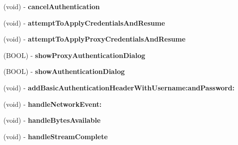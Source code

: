 \begin{DoxyCompactItemize}
\item 
\hypertarget{interface_a_s_i_h_t_t_p_request_a25d3d77f917c5f8b9956f6a45022dae2}{
(void) -\/ {\bfseries cancel\-Authentication}}
\label{interface_a_s_i_h_t_t_p_request_a25d3d77f917c5f8b9956f6a45022dae2}

\item 
\hypertarget{interface_a_s_i_h_t_t_p_request_ad3da0a488faf41101bbf73a8071456e8}{
(void) -\/ {\bfseries attempt\-To\-Apply\-Credentials\-And\-Resume}}
\label{interface_a_s_i_h_t_t_p_request_ad3da0a488faf41101bbf73a8071456e8}

\item 
\hypertarget{interface_a_s_i_h_t_t_p_request_a03ce363e92c2d5dbe7229f021b0230a5}{
(void) -\/ {\bfseries attempt\-To\-Apply\-Proxy\-Credentials\-And\-Resume}}
\label{interface_a_s_i_h_t_t_p_request_a03ce363e92c2d5dbe7229f021b0230a5}

\item 
\hypertarget{interface_a_s_i_h_t_t_p_request_ad9c4b7b0abc790e74806860c6d7a7a5b}{
(\-B\-O\-O\-L) -\/ {\bfseries show\-Proxy\-Authentication\-Dialog}}
\label{interface_a_s_i_h_t_t_p_request_ad9c4b7b0abc790e74806860c6d7a7a5b}

\item 
\hypertarget{interface_a_s_i_h_t_t_p_request_a64d812546f152b29ddd614938ffa5539}{
(\-B\-O\-O\-L) -\/ {\bfseries show\-Authentication\-Dialog}}
\label{interface_a_s_i_h_t_t_p_request_a64d812546f152b29ddd614938ffa5539}

\item 
\hypertarget{interface_a_s_i_h_t_t_p_request_a0295b7fbbc9af2be76f9dfe06f75f1ca}{
(void) -\/ {\bfseries add\-Basic\-Authentication\-Header\-With\-Username\-:and\-Password\-:}}
\label{interface_a_s_i_h_t_t_p_request_a0295b7fbbc9af2be76f9dfe06f75f1ca}

\item 
\hypertarget{interface_a_s_i_h_t_t_p_request_a271ec6e669cafa5063866022fb3577ba}{
(void) -\/ {\bfseries handle\-Network\-Event\-:}}
\label{interface_a_s_i_h_t_t_p_request_a271ec6e669cafa5063866022fb3577ba}

\item 
\hypertarget{interface_a_s_i_h_t_t_p_request_aefae44a699dc9e70b78930322cfb3558}{
(void) -\/ {\bfseries handle\-Bytes\-Available}}
\label{interface_a_s_i_h_t_t_p_request_aefae44a699dc9e70b78930322cfb3558}

\item 
\hypertarget{interface_a_s_i_h_t_t_p_request_aaf27f7d11cd1194d5087db56cc553d89}{
(void) -\/ {\bfseries handle\-Stream\-Complete}}
\label{interface_a_s_i_h_t_t_p_request_aaf27f7d11cd1194d5087db56cc553d89}


\end{DoxyCompactItemize}
